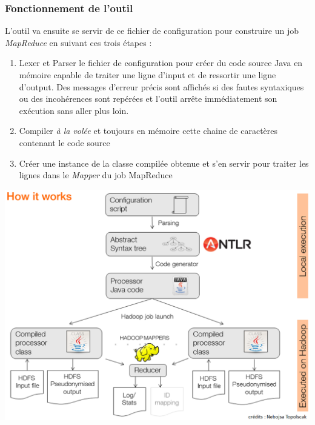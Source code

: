 \documentclass[12pt]{report}
\begin{document}
	\subsubsection{Fonctionnement de l'outil}
	L'outil va ensuite se servir de ce fichier de configuration pour construire un job \textit{MapReduce} en suivant ces trois étapes :
	\begin{enumerate}
		\item Lexer et Parser le fichier de configuration pour créer du code source Java en mémoire capable de traiter une ligne d'input et de ressortir une ligne d'output. Des messages d'erreur précis sont affichés si des fautes syntaxiques ou des incohérences sont repérées et l'outil arrête immédiatement son exécution sans aller plus loin.
		\item Compiler \textit{à la volée} et toujours en mémoire cette chaine de caractères contenant le code source
		\item Créer une instance de la classe compilée obtenue et s'en servir pour traiter les lignes dans le \textit{Mapper} du job MapReduce
	\end{enumerate}
	\begin{center}
		\includegraphics[scale=0.6]{pseudo_diag_.png}\newline
	\end{center}
\end{document}
